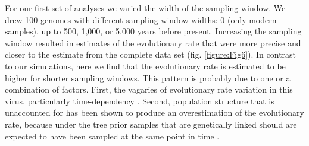 \documentclass[11pt]{article}
\begin{document}
For our first set of analyses we varied the width of the sampling window. We drew 100 genomes with different sampling window widths: 0 (only modern samples), up to 500, 1,000, or 5,000 years before present. Increasing the sampling window resulted in estimates of the evolutionary rate that were more precise and closer to the estimate from the complete data set (fig. \ref{figure:Fig6}). In contrast to our simulations, here we find that the evolutionary rate is estimated to be higher for shorter sampling windows. This pattern is probably due to one or a combination of factors. First, the vagaries of evolutionary rate variation in this virus, particularly time-dependency \citep{vrancken2017accurate}. Second, population structure that is unaccounted for has been shown to produce an overestimation of the evolutionary rate, because under the tree prior samples that are genetically linked should are expected to have been sampled at the same point in time \citep{moller2018impact}.
\end{document}
